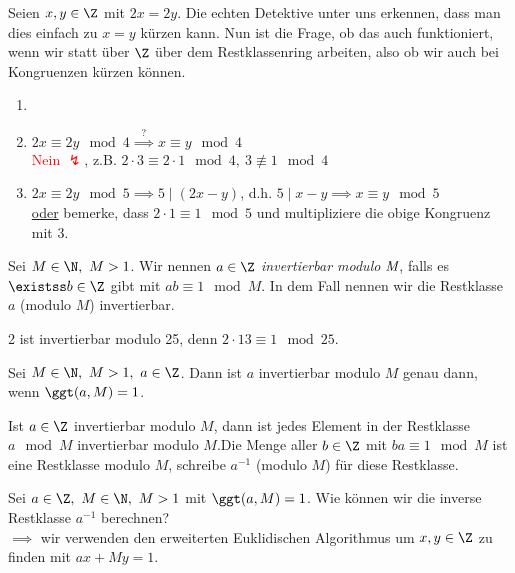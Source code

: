 Seien \( x,y \in \Z \) mit $2x = 2y $. Die echten Detektive unter uns erkennen, dass man dies einfach zu $x = y$ kürzen kann. Nun ist die Frage, ob das auch funktioniert, wenn wir statt über $\Z$ über dem Restklassenring arbeiten, also ob wir auch bei Kongruenzen kürzen können.

\begin{exmp*}
	\begin{enumerate}
		\item[]
		\item \( 2x \equiv 2y \mod 4 \overset{?}{\implies} x \equiv y \mod 4 \)\\
			\textcolor{red}{Nein $\lightning$}, z.B. \( 2 \cdot 3 \equiv 2 \cdot 1 \mod 4,\ 3 \not\equiv 1 \mod 4 \)
		\item \( 2x \equiv 2y \mod 5 \implies 5 \mid (2x-y) \), d.h. \( 5 \mid x-y \implies x \equiv y \mod 5 \)\\
			\underline{oder} bemerke, dass \( 2 \cdot 1 \equiv 1 \mod 5 \) und multipliziere die obige Kongruenz mit 3.
	\end{enumerate}
\end{exmp*}

\begin{defn*}
	Sei \( M \in \N,\ M > 1 \). Wir nennen \( a \in \Z \) \emph{invertierbar modulo $\emph{M}$}, falls es \( \existss b \in \Z \) gibt mit \( ab \equiv 1 \mod M \). In dem Fall nennen wir die Restklasse \( a\) (modulo $M$) invertierbar.
\end{defn*}

\begin{exmp*}
	2 ist invertierbar modulo 25, denn \( 2 \cdot 13 \equiv 1 \mod 25 \).
\end{exmp*}

\begin{thm}\autolabel
	Sei \( M \in \N,\ M > 1,\ a \in \Z \). Dann ist $a$ invertierbar modulo $M$ genau dann, wenn \( \ggt(a,M) = 1 \).
\end{thm}

\begin{rem*}
	Ist \( a \in \Z \) invertierbar modulo $M$, dann ist jedes Element in der Restklasse $a \mod M$ invertierbar modulo $M$.\video Die Menge aller $b \in \Z$ mit $ba \equiv 1 \mod M$ ist eine Restklasse modulo $M$, schreibe $a^{-1}$ (modulo $M$) für diese Restklasse.
\end{rem*}

Sei \( a \in \Z,\ M \in \N,\ M > 1 \) mit \( \ggt(a,M) = 1 \). Wie können wir die inverse Restklasse $a^{-1}$ berechnen?\\
$\implies$ wir verwenden den erweiterten Euklidischen Algorithmus um \( x,y \in \Z \) zu finden mit \( ax+My = 1 \).


